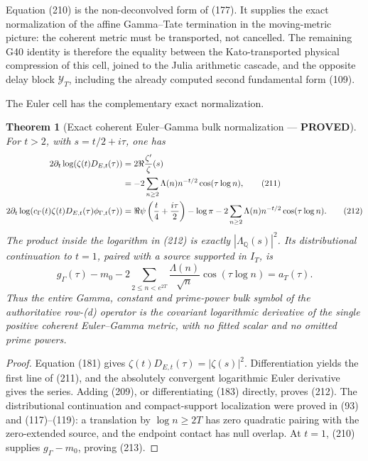 \documentclass[11pt]{article}
\newtheorem{theorem}{Theorem}
\newcommand{\PROVED}{\textcolor{green!45!black}{\textbf{PROVED}}}
\begin{document}
Equation (210) is the non-deconvolved form of (177).  It supplies the exact
normalization of the affine Gamma--Tate termination in the moving-metric
picture: the coherent metric must be transported, not cancelled.  The
remaining G40 identity is therefore the equality between the Kato-transported
physical compression of this cell, joined to the Julia arithmetic cascade,
and the opposite delay block $\mathcal Y_T$, including the already computed
second fundamental form (109).

The Euler cell has the complementary exact normalization.

\begin{theorem}[Exact coherent Euler--Gamma bulk normalization --- \PROVED]
For $t>2$, with $s=t/2+i\tau$, one has
\begin{align}
 2\partial_t\log\!\left(\zeta(t)D_{E,t}(\tau)\right)
 &=2\Re\frac{\zeta'}{\zeta}(s)                       \notag\\
 &=-2\sum_{n\ge2}\Lambda(n)n^{-t/2}
                  \cos(\tau\log n),                  \tag{211}\\
 2\partial_t\log\!\left(
 c_\Gamma(t)\zeta(t)D_{E,t}(\tau)
 \phi_{\Gamma,t}(\tau)\right)
 &=\Re\psi\left(\frac t4+\frac{i\tau}{2}\right)
   -\log\pi
   -2\sum_{n\ge2}\Lambda(n)n^{-t/2}
                  \cos(\tau\log n).                 \tag{212}
\end{align}
The product inside the logarithm in (212) is exactly
$|\Lambda_{\mathbb Q}(s)|^2$.  Its distributional continuation to $t=1$,
paired with a source supported in $I_T$, is
\begin{equation}
 g_\Gamma(\tau)-m_0
 -2\sum_{2\le n<e^{2T}}\frac{\Lambda(n)}{\sqrt n}
       \cos(\tau\log n)=a_T(\tau).                  \tag{213}
\end{equation}
Thus the entire Gamma, constant and prime-power bulk symbol of the
authoritative row-(d) operator is the covariant logarithmic derivative of the
single positive coherent Euler--Gamma metric, with no fitted scalar and no
omitted prime powers.
\end{theorem}

\begin{proof}
Equation (181) gives
$\zeta(t)D_{E,t}(\tau)=|\zeta(s)|^2$.  Differentiation yields the first line
of (211), and the absolutely convergent logarithmic Euler derivative gives
the series.  Adding (209), or differentiating (183) directly, proves (212).
The distributional continuation and compact-support localization were proved
in (93) and (117)--(119): a translation by $\log n\ge2T$ has zero quadratic
pairing with the zero-extended source, and the endpoint contact has null
overlap.  At $t=1$, (210) supplies $g_\Gamma-m_0$, proving (213).
\end{proof}
\end{document}
